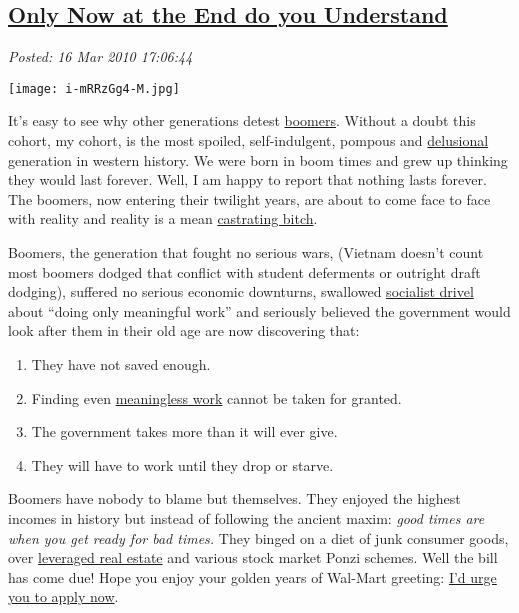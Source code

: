 %

\subsection*{\href{http://bakerjd99.wordpress.com/2010/03/16/only-now-at-the-end-do-you-understand/}{Only Now at the End do you Understand}}


\noindent\emph{Posted: 16 Mar 2010 17:06:44}
\vspace{6pt}

\captionsetup[floatingfigure]{labelformat=empty}
\begin{floatingfigure}[l]{0.25\textwidth}
\centering
\texttt{[image: i-mRRzGg4-M.jpg]}
\label{fig:466X0}
\end{floatingfigure} It's
easy to see why other generations detest
\href{http://tierneylab.blogs.nytimes.com/2007/03/05/the-ailing-or-wailing-baby-boomers/}{boomers}.
Without a doubt this cohort, my cohort, is the most spoiled,
self-indulgent, pompous and
\href{http://www.ageinplacetech.com/blog/metlife-are-boomers-middleof-self-delusion}{delusional}
generation in western history. We were born in boom times and grew up
thinking they would last forever. Well, I am happy to report that
nothing lasts forever. The boomers, now entering their twilight years,
are about to come face to face with reality and reality is a mean
\href{http://www.urbandictionary.com/products.php?defid=2255635}{castrating
bitch}.

Boomers, the generation that fought no serious wars, (Vietnam doesn't
count most boomers dodged that conflict with student deferments or
outright draft dodging), suffered no serious economic downturns,
swallowed
\href{http://www.marketoracle.co.uk/Article3357.html}{socialist
drivel} about ``doing only meaningful work'' and seriously believed the
government would look after them in their old age are now discovering
that:

\begin{enumerate}
\item
  They have not saved enough.
\item
  Finding even
  \href{http://www.artnotart.com/fluxus/wdemaria-meaninglesswork.html}{meaningless
  work} cannot be taken for granted.
\item
  The government takes more than it will ever give.
\item
  They will have to work until they drop or starve.
\end{enumerate}
Boomers have nobody to blame but themselves. They enjoyed the highest
incomes in history but instead of following the ancient maxim:
\emph{good times are when you get ready for bad times.} They binged on a
diet of junk consumer goods, over
\href{http://www.irvinehousingblog.com/blog/category/mortgage-fraud/}{leveraged
real estate} and various stock market Ponzi schemes. Well the bill has
come due! Hope you enjoy your golden years of Wal-Mart greeting:
\href{http://www.spartantailgate.com/forums/msu-red-cedar-message-board/302784-old-man-walmart-application.html}{I'd
urge you to apply now}.

